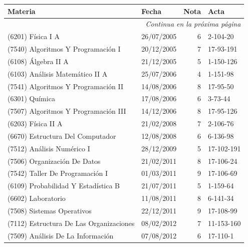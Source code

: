 \documentclass[a4paper,11pt]{article}
\begin{document}
\begin{longtable}{|l|l|r|l|}
  \hline
  Materia                                       & Fecha      & Nota & Acta              \\
  \hline
  \endhead

  \hline
  \multicolumn{4}{r}{\textit{Continua en la próxima página}} \\
  \endfoot

  \hline
  \endlastfoot

  (6201) Física I A                          & 26/07/2005 & 6  & 2-104-20          \\
  (7540) Algoritmos Y Programación I         & 20/12/2005 & 7  & 17-93-191         \\
  (6108) Álgebra II A                        & 21/12/2005 & 5  & 1-150-126         \\
  (6103) Análisis Matemático II A            & 25/07/2006 & 4  & 1-151-98          \\
  (7541) Algoritmos Y Programación II        & 14/08/2006 & 8  & 17-95-50          \\
  (6301) Química                             & 17/08/2006 & 6  & 3-73-44           \\
  (7507) Algoritmos Y Programación III       & 14/12/2006 & 8  & 17-95-126         \\
  (6203) Física II A                         & 21/02/2008 & 7  & 2-106-76          \\
  (6670) Estructura Del Computador           & 12/08/2008 & 6  & 6-136-98          \\
  (7512) Análisis Numérico I                 & 28/12/2009 & 5  & 17-102-191        \\
  (7506) Organización De Datos               & 21/02/2011 & 8  & 17-106-24         \\
  (7542) Taller De Programación I            & 01/03/2011 & 9  & 17-106-69         \\
  (6109) Probabilidad Y Estadística B        & 21/07/2011 & 5  & 1-159-64          \\
  (6602) Laboratorio                         & 11/08/2011 & 8  & 6-141-34          \\
  (7508) Sistemas Operativos                 & 22/12/2011 & 9  & 17-108-99         \\
  (7112) Estructura De Las Organizaciones    & 08/02/2012 & 7  & 11-153-160        \\
  (7509) Análisis De La Información          & 07/08/2012 & 6  & 17-110-1          \\

\end{longtable}
\end{document}
